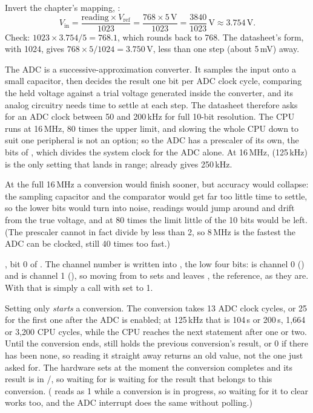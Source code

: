 
Invert the chapter's mapping, :
\[
  V_\text{in} = \frac{\text{reading} \times V_\text{ref}}{1023}
    = \frac{768 \times 5\,\text{V}}{1023} = \frac{3840}{1023}\,\text{V} \approx 3.754\,\text{V}.
\]
Check: $1023 \times 3.754 / 5 = 768.1$, which rounds back to 768. The datasheet's form, with 1024,
gives $768 \times 5 / 1024 = 3.750$\,V, less than one step (about 5\,mV) away.

The ADC is a successive-approximation converter. It samples the input onto a small capacitor, then
decides the result one bit per ADC clock cycle, comparing the held voltage against a trial voltage
generated inside the converter, and its analog circuitry needs time to settle at each step. The
datasheet therefore asks for an ADC clock between 50 and 200\,kHz for full 10-bit resolution. The
CPU runs at 16\,MHz, 80 times the upper limit, and slowing the whole CPU down to suit one
peripheral is not an option; so the ADC has a prescaler of its own, the  bits of
, which divides the system clock for the ADC alone. At 16\,MHz, 
(125\,kHz) is the only setting that lands in range;  already gives 250\,kHz.

At the full 16\,MHz a conversion would finish sooner, but accuracy would collapse: the sampling
capacitor and the comparator would get far too little time to settle, so the lower bits would turn
into noise, readings would jump around and drift from the true voltage, and at 80 times the limit
little of the 10 bits would be left. (The prescaler cannot in fact divide by less than 2, so
8\,MHz is the fastest the ADC can be clocked, still 40 times too fast.)

, bit 0 of . The channel number is written into , the low four
bits:  is channel 0 () and  is channel 1 (), so moving from
 to  sets  and leaves , the  reference,
as they are. With  that is simply a call with  set to 1.

Setting  only \emph{starts} a conversion. The conversion takes 13 ADC clock cycles, or
25 for the first one after the ADC is enabled; at 125\,kHz that is 104\,\textmu s or 200\,\textmu s,
1,664 or 3,200 CPU cycles, while the CPU reaches the next statement after one or two. Until the
conversion ends,  still holds the previous conversion's result, or 0 if there has been
none, so reading it straight away returns an old value, not the one just asked for. The hardware
sets  at the moment the conversion completes and its result is in
/, so waiting for  is waiting for the result that belongs to this
conversion. ( reads as 1 while a conversion is in progress, so waiting for it to clear
works too, and the ADC interrupt does the same without polling.)

